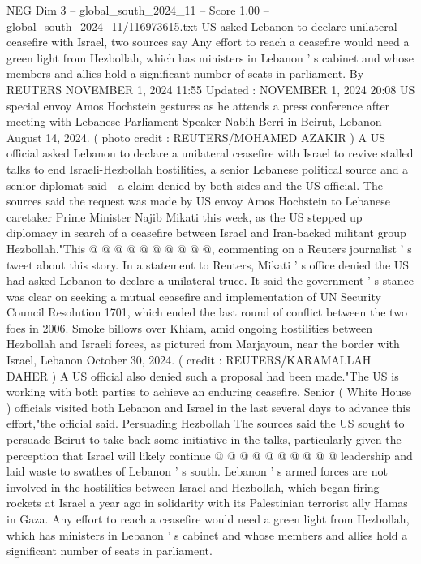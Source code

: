 \begin{textsample}{NEG Dim 3 – global\_south\_2024\_11 – Score 1.00 – global\_south\_2024\_11/116973615.txt}  \label{ex:f3_neg_159}
US asked Lebanon to declare unilateral ceasefire with Israel, two sources say Any effort to reach a ceasefire would need a green light from Hezbollah, which has ministers in Lebanon ' s cabinet and whose members and allies hold a significant number of seats in parliament.
By REUTERS NOVEMBER 1, 2024 11:55 Updated : NOVEMBER 1, 2024 20:08 US special envoy Amos Hochstein gestures as he attends a press conference after meeting with Lebanese Parliament Speaker Nabih Berri in Beirut, Lebanon August 14, 2024. ( photo credit : REUTERS/MOHAMED AZAKIR ) A US official asked Lebanon to declare a unilateral ceasefire with Israel to revive stalled talks to end Israeli-Hezbollah hostilities, a senior Lebanese political source and a senior diplomat said - a claim denied by both sides and the US official.
The sources said the request was made by US envoy Amos Hochstein to Lebanese caretaker Prime Minister Najib Mikati this week, as the US stepped up diplomacy in search of a ceasefire between Israel and Iran-backed militant group Hezbollah."This @ @ @ @ @ @ @ @ @ @, commenting on a Reuters journalist ' s tweet about this story.
In a statement to Reuters, Mikati ' s office denied the US had asked Lebanon to declare a unilateral truce.
It said the government ' s stance was clear on seeking a mutual ceasefire and implementation of UN Security Council Resolution 1701, which ended the last round of conflict between the two foes in 2006.
Smoke billows over Khiam, amid ongoing hostilities between Hezbollah and Israeli forces, as pictured from Marjayoun, near the border with Israel, Lebanon October 30, 2024. ( credit : REUTERS/KARAMALLAH DAHER ) A US official also denied such a proposal had been made."The US is working with both parties to achieve an enduring ceasefire.
Senior ( White House ) officials visited both Lebanon and Israel in the last several days to advance this effort,"the official said.
Persuading Hezbollah The sources said the US sought to persuade Beirut to take back some initiative in the talks, particularly given the perception that Israel will likely continue @ @ @ @ @ @ @ @ @ @ leadership and laid waste to swathes of Lebanon ' s south.
Lebanon ' s armed forces are not involved in the hostilities between Israel and Hezbollah, which began firing rockets at Israel a year ago in solidarity with its Palestinian terrorist ally Hamas in Gaza.
Any effort to reach a ceasefire would need a green light from Hezbollah, which has ministers in Lebanon ' s cabinet and whose members and allies hold a significant number of seats in parliament.

\end{textsample}
